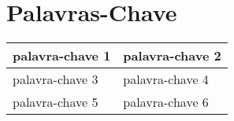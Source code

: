 \section{Palavras-Chave}

\begin{table}[h]
\centering
\label{tbl:palavras_chave}
\begin{tabular}{|l|l|}
\hline
palavra-chave 1 & palavra-chave 2 \\ \hline
palavra-chave 3 & palavra-chave 4 \\ \hline
palavra-chave 5 & palavra-chave 6 \\ \hline
\end{tabular}
\end{table}